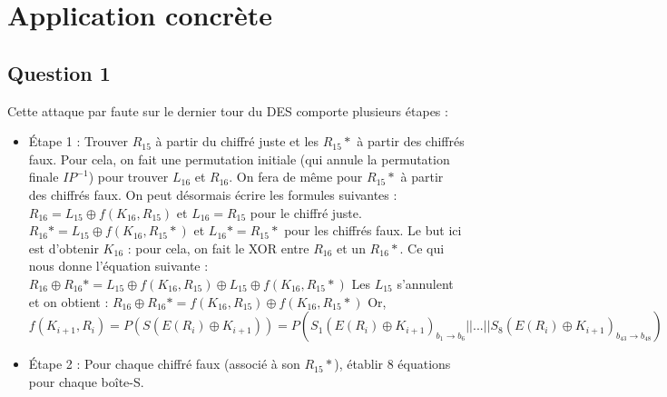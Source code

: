 \documentclass[12pt,a4paper]{report}
\begin{document}
\newpage

\section{Application concrète}

\subsection{Question 1}

Cette attaque par faute sur le dernier tour du DES comporte plusieurs étapes : 

\begin{itemize}
	\item Étape 1 : Trouver $R_{15}$ à partir du chiffré juste et les $R_{15}*$ à partir des chiffrés faux. \newline Pour cela, on fait une permutation initiale (qui annule la permutation finale $IP^{-1}$) pour trouver $L_{16}$ et $R_{16}$. On fera de même pour $R_{15}*$ à partir des chiffrés faux. On peut désormais écrire les formules suivantes : \newline \newline $R_{16}= L_{15} \oplus f(K_{16}, R_{15})$ et $L_{16}=R_{15}$ pour le chiffré juste. 
	\newline $R_{16}*= L_{15} \oplus f(K_{16}, R_{15}*)$ et $L_{16}*=R_{15}*$ pour les chiffrés faux. \newline \newline Le but ici est d'obtenir $K_{16}$ : pour cela, on fait le XOR entre $R_{16}$ et un $R_{16}*$. Ce qui nous donne l'équation suivante : \newline \newline
	$R_{16} \oplus R_{16}* =  L_{15} \oplus f(K_{16}, R_{15}) \oplus L_{15} \oplus f(K_{16}, R_{15}*)$ \newline 
	Les $L_{15}$ s'annulent et on obtient : $R_{16} \oplus R_{16}* = f(K_{16}, R_{15}) \oplus f(K_{16}, R_{15}*)$ \newline \newline
	Or, $f(K_{i+1}, R_{i})=P(S(E(R_{i})\oplus K_{i+1})) = P(S_1(E(R_i)\oplus K_{i+1})_{b_1\to b_6} || ... || S_8(E(R_i)\oplus K_{i+1})_{b_{43}\to b_{48}})$ \newline
		
	\item Étape 2 : Pour chaque chiffré faux (associé à son $R_{15}*$), établir 8 équations pour chaque boîte-S. 


\end{itemize}
\end{document}
